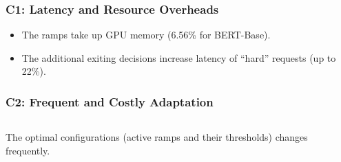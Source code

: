 \documentclass[12pt,aspectratio=169]{beamer}
\begin{document}
    \begin{frame}
        \frametitle{C1: Latency and Resource Overheads}

        \begin{itemize}
            \setlength{\itemsep}{1em}
            \item The ramps take up GPU memory (6.56\% for BERT-Base).
            \item The additional exiting decisions increase latency of ``hard'' requests (up to 22\%).
        \end{itemize}
    \end{frame}

    \begin{frame}
        \frametitle{C2: Frequent and Costly Adaptation}

        \begin{columns}
            \begin{column}{0.5\textwidth}
                The optimal configurations (active ramps and their thresholds) changes frequently.


\end{column}
\end{columns}
\end{frame}
\end{document}
